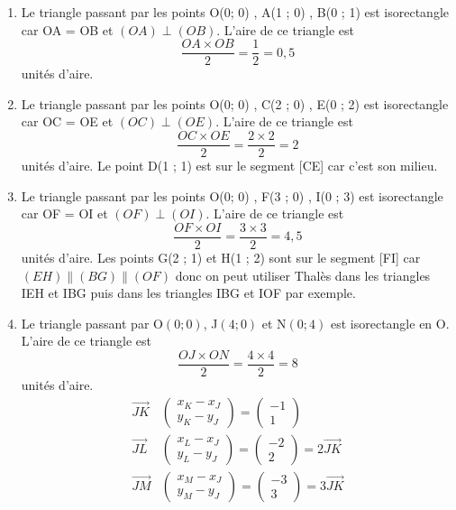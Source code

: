\documentclass[11pt]{article}
\begin{document}
\begin{enumerate}
\item Le triangle passant par les points O(0; 0) , A(1 ; 0) , B(0 ; 1)
est isorectangle car OA = OB et \((OA)\perp (OB)\).
L'aire de ce triangle est \[\dfrac{OA\times OB}{2} = \dfrac{1}{2} =
   0,5\] unités d'aire.
\item Le triangle passant par les points O(0; 0) , C(2 ; 0) , E(0 ; 2)
est isorectangle car OC = OE et \((OC)\perp (OE)\).
L'aire de ce triangle est \[\dfrac{OC\times OE}{2} = \dfrac{2\times
   2}{2} = 2\] unités d'aire.
Le point D(1 ; 1) est sur le segment [CE] car c'est son milieu.
\item Le triangle passant par les points O(0; 0) , F(3 ; 0) , I(0 ; 3)
est isorectangle car OF = OI et \((OF)\perp (OI)\).
L'aire de ce triangle est \[\dfrac{OF\times OI}{2} = \dfrac{3\times
   3}{2} = 4,5\] unités d'aire.
Les points G(2 ; 1) et H(1 ; 2) sont sur le segment [FI] car
\((EH)\parallel (BG)\parallel (OF)\) donc on peut utiliser Thalès
dans les triangles IEH et IBG puis dans les triangles IBG et IOF
par exemple.
\item Le triangle passant par O\((0 ; 0)\), J\((4 ; 0)\) et N\((0 ; 4)\) est
isorectangle en O.
L'aire de ce triangle est 
      \[\dfrac{OJ\times ON}{2} = \dfrac{4\times 4}{2} = 8\] unités
d'aire.
\begin{align*}
     \overrightarrow{JK}&\begin{pmatrix}x_K - x_J\\ y_K - y_J\end{pmatrix}=\begin{pmatrix}-1\\1\end{pmatrix}\\
     \overrightarrow{JL}&\begin{pmatrix}x_L - x_J\\ y_L - y_J\end{pmatrix}=\begin{pmatrix}-2\\ 2\end{pmatrix} = 2\overrightarrow{JK}\\
     \overrightarrow{JM}&\begin{pmatrix}x_M - x_J\\ y_M - y_J\end{pmatrix}=\begin{pmatrix}-3\\ 3\end{pmatrix} = 3\overrightarrow{JK}\\

\end{align*}
\end{enumerate}
\end{document}
